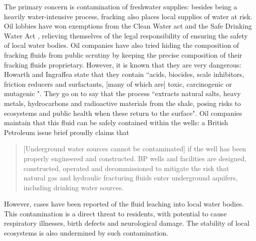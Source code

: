 \documentclass[12pt,letterpaper]{article}
\begin{document}
The primary concern is contamination of freshwater supplies: besides being a heavily water-intensive process, fracking also places local supplies of water at risk. Oil lobbies have won exemptions from the Clean Water act and the Safe Drinking Water Act \cite[272]{nature}, relieving themselves of the legal responsibility of ensuring the safety of local water bodies.
Oil companies have also tried hiding the composition of fracking fluids from public scrutiny by keeping the precise composition of their fracking fluids proprietary.
However, it is known that they are very dangerous: Howarth and Ingraffea state that they contain ``acids, biocides, scale inhibitors, friction reducers and surfactants, [many of which are] toxic, carcinogenic or mutagenic ". They go on to say that the process ``extracts natural salts, heavy metals, hydrocarbons and radioactive materials from the shale, posing risks to ecosystems and public health when these return to the surface"\cite[272]{nature}.
Oil companies maintain that this fluid can be safely contained within the wells: a British Petroleum issue brief proudly claims that
\begin{quote}
[Underground water sources cannot be contaminated] if the well has been properly engineered and constructed. BP wells and facilities are designed, constructed, operated and decommissioned to mitigate the risk that natural gas and hydraulic fracturing fluids enter underground aquifers, including drinking water sources. \cite[4]{bp}
\end{quote}
 However, cases \cite[272]{nature} have been reported of the fluid leaching into local water bodies. This contamination is a direct threat to residents, with potential to cause respiratory illnesses, birth defects and neurological damage. The stability of local ecosystems is also undermined by such contamination. 
\end{document}
